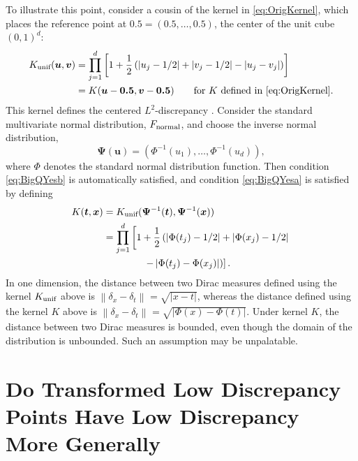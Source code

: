 \documentclass[graybox]{svmult}
\newcommand{\vx}{\boldsymbol{x}}
\newcommand{\vt}{\boldsymbol{t}}
\newcommand{\vu}{\boldsymbol{u}}
\newcommand{\vv}{\boldsymbol{v}}
\newcommand{\vPsi}{\boldsymbol{\Psi}}
\newcommand{\norm}[2][{}]{\ensuremath{\left \lVert #2 \right \rVert}_{#1}}
\newcommand{\unif}{\textup{unif}}
\newcommand{\normal}{\textup{normal}}
\begin{document}
To illustrate this point, consider a cousin of the kernel in \eqref{eq:OrigKernel}, which places the reference point at $\boldsymbol{0.5} = (0.5, \ldots, 0.5)$, the center of the unit cube $(0,1)^d$:
\begin{align}
\label{eq:L2kernel}
    K_{\unif}(\vu,\vv) &= \prod_{j=1}^d\left[1+\frac{1}{2}\left(\left|u_j-1/2\right|+ \left|v_j- 1/2 \right|-\left |u_j-v_j \right| \right) \right] \\
    \nonumber
    & = K(\vu - \boldsymbol{0.5}, \vv - \boldsymbol{0.5}) \qquad \text{for $K$ defined in \eqref{eq:OrigKernel}}. 
\end{align}
This kernel defines the centered $L^2$-discrepancy \cite{Hic97a}.
Consider the standard multivariate normal distribution, $F_\normal$, and choose the inverse normal distribution,
\begin{equation} \label{eq:invNormTrans}
    \vPsi(\vu) = (\Phi^{-1}(u_1), \ldots, \Phi^{-1}(u_d)),
\end{equation}
where $\Phi$ denotes the standard normal distribution function.  Then condition \eqref{eq:BigQYesb} is automatically satisfied, and condition \eqref{eq:BigQYesa} is  satisfied by defining
\begin{align}
\nonumber
     K(\vt,\vx) &= K_{\unif}(\vPsi^{-1}(\vt),\vPsi^{-1}(\vx)) \\
     \nonumber
      &= \prod_{j=1}^d\left[1+\frac{1}{2}\left(\left|\Phi(t_j)-1/2\right|+ \left|\Phi(x_j)- 1/2 \right| \right . \right . \\
      \nonumber
      & \qquad \qquad \left.  \left . -\left|\Phi(t_j)-\Phi(x_j)\right|\right)\right].
\end{align}
In one dimension, the distance between two Dirac measures defined using the kernel $K_\unif$ above is $\norm{\delta_{x} - \delta_{t}} = \sqrt{|x-t|}$, whereas the distance defined using the kernel $K$ above is $\norm{\delta_{x} - \delta_{t}} = \sqrt{|\Phi(x)-\Phi(t)|}$. Under kernel $K$, the distance between two Dirac measures is bounded, even though the domain of the distribution is unbounded.  Such an assumption may be unpalatable.

\section{Do Transformed Low Discrepancy Points Have Low Discrepancy More Generally} \label{sec:DoTransformedPts}
\end{document}
